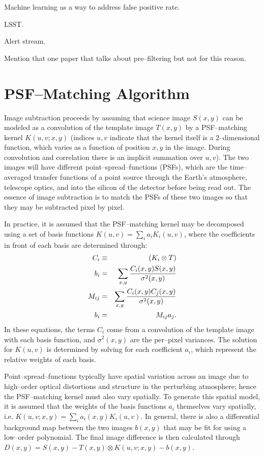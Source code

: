 \documentclass[floatfix, apj]{emulateapj}
\begin{document}
Machine learning as a way to address false positive rate.

LSST.

Alert stream.

Mention that one paper that talks about pre--filtering but not for this reason.

\section{PSF--Matching Algorithm}

Image subtraction proceeds by assuming that science image $S(x,y)$ can be modeled as a convolution of the template image $T(x,y)$ by a PSF--matching kernel $K(u,v;x,y)$ (indices $u,v$ indicate that the kernel itself is a 2--dimensional function, which varies as a function of position $x,y$ in the image.
During convolution and correlation there is an implicit summation over $u,v$).
The two images will have different point--spread--functions (PSFs), which are the time--averaged transfer functions of a point source through the Earth's atmosphere, telescope optics, and into the silicon of the detector before being read out.
The essence of image subtraction is to match the PSFs of these two images so that they may be subtracted pixel by pixel.

In practice, it is assumed that the PSF--matching kernel may be decomposed using a set of basis functions $K(u,v) = \sum_i a_i K_i(u,v)$, where the coefficients in front of each basis are determined through:
\begin{eqnarray}
\label{eq-soln}
C_i & \equiv & (K_i \otimes T) \\ 
b_{i}  & = & \sum_{x,y} {{C_i(x,y) S(x,y)}\over{\sigma^2(x,y)}}   \nonumber \\
M_{ij} & = & \sum_{x,y} {{C_i(x,y) C_j(x,y)}\over{\sigma^2(x,y)}}  \nonumber \\
b_{i}  & = & M_{ij} a_{j}. \nonumber
\end{eqnarray}
In these equations, the terms $C_i$ come from a convolution of the template image with each basis function, and $\sigma^2(x,y)$ are the per--pixel variances.
The solution for $K(u,v)$ is determined by solving for each coefficient $a_i$, which represent the relative weights of each basis.

Point--spread--functions typically have spatial variation across an image due to high--order optical distortions and structure in the perturbing atmosphere; hence the PSF--matching kernel must also vary spatially.
To generate this spatial model, it is assumed that the weights of the basis functions $a_i$ themselves vary spatially, i.e. $K(u,v;x,y) = \sum_i a_i(x,y) K_i(u,v)$.
In general, there is also a differential background map between the two images $b(x,y)$ that may be fit for using a low--order polynomial.
The final image difference is then calculated through $D(x,y) = S(x,y) - T(x,y) \otimes K(u,v;x,y) - b(x,y)$.
\end{document}
